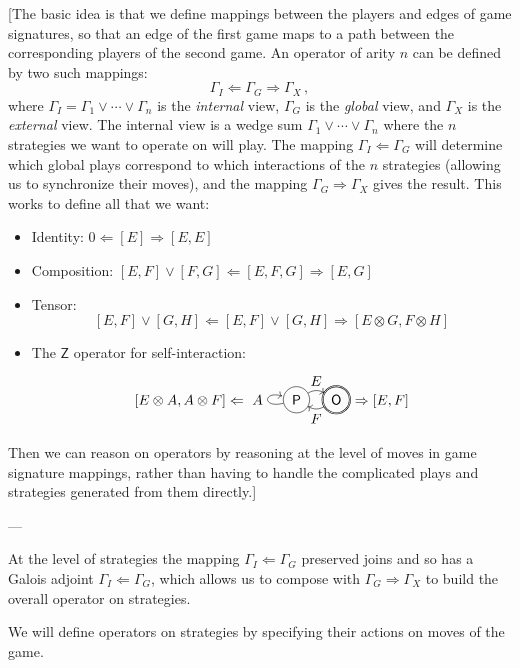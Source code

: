 \documentclass[format=sigplan,authordraft]{acmart}
\newcommand{\kw}[1]{\ensuremath{ \mathsf{#1} }}
\begin{document}
[The basic idea is that we define
mappings between the players and edges of game signatures,
so that an edge of the first game maps to a path between
the corresponding players of the second game.
An operator of arity $n$ can be defined by two such mappings:
\[ \Gamma_I \Leftarrow \Gamma_G \Rightarrow \Gamma_X \,, \]
where $\Gamma_I = \Gamma_1 \vee \cdots \vee \Gamma_n$ is the \emph{internal} view,
$\Gamma_G$ is the \emph{global} view,
and $\Gamma_X$ is the \emph{external} view.
The internal view is a wedge sum
$\Gamma_1 \vee \cdots \vee \Gamma_n$
where the $n$ strategies we want to operate on
will play.
The mapping $\Gamma_I \Leftarrow \Gamma_G$
will determine which global plays correspond
to which interactions of the $n$ strategies
(allowing us to synchronize their moves),
and the mapping $\Gamma_G \Rightarrow \Gamma_X$
gives the result.
This works to define all that we want:
\begin{itemize}
\item Identity: $0 \Leftarrow [E] \Rightarrow [E,E]$
\item Composition: $[E,F] \vee [F,G] \Leftarrow [E,F,G] \Rightarrow [E,G]$
\item Tensor: \[ [E,F] \vee [G,H] \Leftarrow [E,F] \vee [G,H] \Rightarrow
  [E \otimes G, F \otimes H] \]
\item The $\kw{Z}$ operator for self-interaction:
  \[ [E \otimes A, A \otimes F] \Leftarrow
  \begin{tikzpicture}[baseline=(O.base)]
    \node[circle,draw] (P) at (-1,0) {$\kw{P}$};
    \node[circle,draw,double] (O) at (0,0) {$\kw{O}$};
    \path[->] (P) edge[loop left] node[auto] {$A$} (P);
    \path[->] (P) edge[bend left] node[above] {$E$} (O);
    \path[->] (O) edge[bend left] node[below] {$F$} (P);
  \end{tikzpicture} \Rightarrow [E,F] \]
\end{itemize}
Then we can reason on operators by reasoning at the level of moves
in game signature mappings,
rather than having to handle the complicated
plays and strategies generated from them
directly.]

---

At the level of strategies the mapping
$\Gamma_I \Leftarrow \Gamma_G$ preserved joins
and so has a Galois adjoint $\Gamma_I \Leftarrow \Gamma_G$,
which allows us to compose with $\Gamma_G \Rightarrow \Gamma_X$
to build the overall operator on strategies.





We will define operators on strategies
by specifying their actions on moves of the game.
\end{document}
